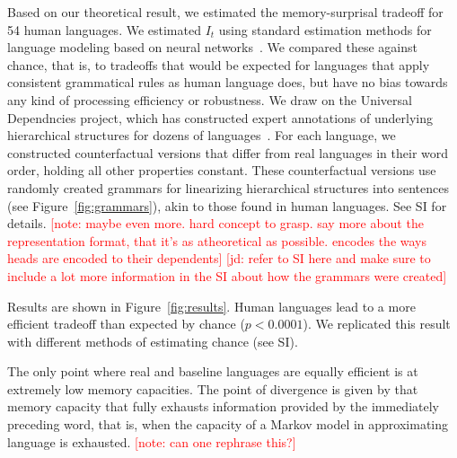 \documentclass[12pt]{article}
\newcommand{\jd}[1]{\textcolor{Red}{[jd: #1]}}
\newcommand{\note}[1]{\textcolor{Red}{[note: #1]}}
\begin{document}
Based on our theoretical result, we estimated the memory-surprisal tradeoff for 54 human languages.
We estimated $I_t$ using standard estimation methods for language modeling based on neural networks~\cite{hochreiter-long-1997}.
We compared these against chance, that is, to tradeoffs that would be expected for languages that apply consistent grammatical rules as human language does, but have no bias towards any kind of processing efficiency or robustness.
We draw on the Universal Dependncies project, which has constructed expert annotations of underlying hierarchical structures for dozens of languages~\cite{nivre-universal-2017}.
For each language, we constructed counterfactual versions that differ from real languages in their word order, holding all other properties constant.
These counterfactual versions use randomly created grammars for linearizing hierarchical structures into sentences (see Figure~\ref{fig:grammars}), akin to those found in human languages.
See SI for details.
\note{maybe even more. hard concept to grasp. say more about the representation format, that it's as atheoretical as possible. encodes the ways heads are encoded to their dependents}
\jd{refer to SI here and make sure to include a lot more information in the SI about how the grammars were created}


%


Results are shown in Figure~\ref{fig:results}.
Human languages lead to a more efficient tradeoff than expected by chance ($p < 0.0001$).
We replicated this result with different methods of estimating chance (see SI).


The only point where real and baseline languages are equally efficient is at extremely low memory capacities.
The point of divergence is given by that memory capacity that fully exhausts information provided by the immediately preceding word, that is, when the capacity of a Markov model in approximating language is exhausted.
\note{can one rephrase this?}
\end{document}
